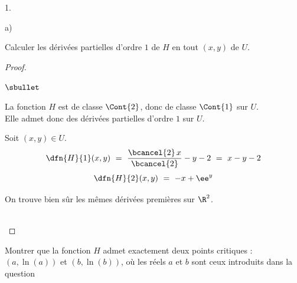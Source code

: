 \begin{noliste}{1.}
  \setlength{\itemsep}{4mm}
  \setcounter{enumi}{12}
  \item 
  \begin{noliste}{a)}
    \setlength{\itemsep}{2mm}
    \item Calculer les dérivées partielles d'ordre $1$ de $H$ en tout 
    $(x,y)$ de $U$.
    
    \begin{proof}~
      \begin{noliste}{$\sbullet$}
	\item La fonction $H$ est de classe $\Cont{2}$, donc de classe 
	$\Cont{1}$ sur $U$.\\
	Elle admet donc des dérivées partielles d'ordre $1$ sur $U$.
	
	\item Soit $(x,y) \in U$.
	\[
	  \dfn{H}{1}(x,y) \ = \ \dfrac{\bcancel{2} \, x}{\bcancel{2}} -y
	  -2 \ = \ x-y-2
	\]
	\[
	  \dfn{H}{2}(x,y) \ = \ -x + \ee^y
	\]
      \end{noliste}
      
      \begin{remark}
        On trouve bien sûr les mêmes dérivées premières sur $\R^2$.
      \end{remark}~\\[-1.4cm]
    \end{proof}
    
    
    \newpage
    
    
    \item Montrer que la fonction $H$ admet exactement deux points 
    critiques : $(a, \ln(a))$ et $(b,\ln(b))$, où les réels $a$ et $b$
    sont ceux introduits dans la question 
    

\end{noliste}
\end{noliste}

